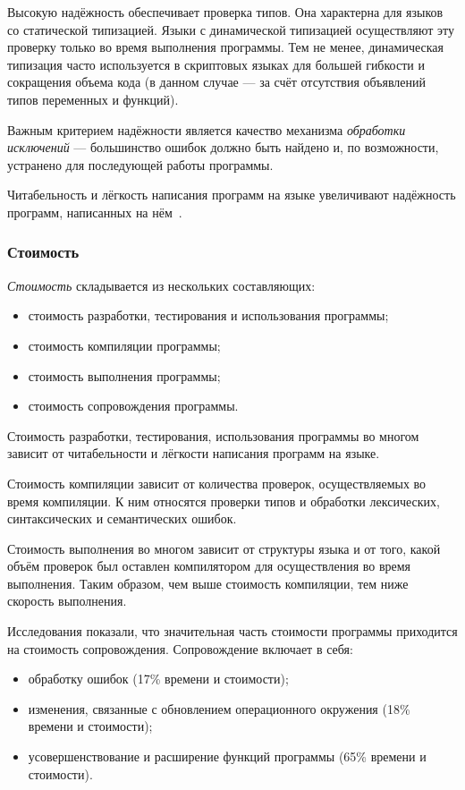             Высокую надёжность обеспечивает проверка типов.
            Она характерна для языков со статической типизацией.
            Языки с динамической типизацией осуществляют эту проверку только во время выполнения программы.
            Тем не менее, динамическая типизация часто используется в скриптовых языках для большей гибкости и сокращения объема кода (в данном случае --- за счёт отсутствия объявлений типов переменных и функций).

            Важным критерием надёжности является качество механизма \textit{обработки исключений} --- большинство ошибок должно быть найдено и, по возможности, устранено для последующей работы программы.

            Читабельность и лёгкость написания программ на языке увеличивают надёжность программ, написанных на нём~\cite{langs}.
        
        \subsubsection{Стоимость}
            \textit{Стоимость} складывается из нескольких составляющих:
            \begin{itemize}
                \item стоимость разработки, тестирования и использования программы;
                \item стоимость компиляции программы;
                \item стоимость выполнения программы;
                \item стоимость сопровождения программы.
            \end{itemize}

            Стоимость разработки, тестирования, использования программы во многом зависит от читабельности и лёгкости написания программ на языке.

            Стоимость компиляции зависит от количества проверок, осуществляемых во время компиляции.
            К ним относятся проверки типов и обработки лексических, синтаксических и семантических ошибок.

            Стоимость выполнения во многом зависит от структуры языка и от того, какой объём проверок был оставлен компилятором для осуществления во время выполнения.
            Таким образом, чем выше стоимость компиляции, тем ниже скорость выполнения.

            Исследования показали\cite{langs}, что значительная часть стоимости программы приходится на стоимость сопровождения.
            Сопровождение включает в себя:
            \begin{itemize}
                \item обработку ошибок (17\% времени и стоимости);
                \item изменения, связанные с обновлением операционного окружения (18\% времени и стоимости);
                \item усовершенствование и расширение функций программы (65\% времени и стоимости).
            \end{itemize}

